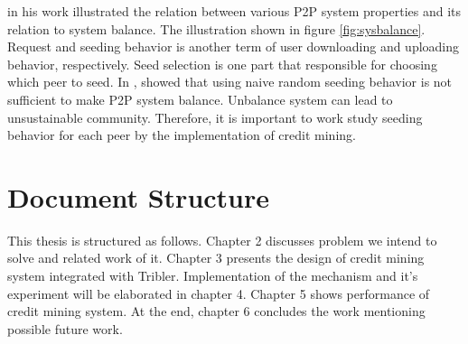 \citeauthor{2011:managesupplydemand:meulpolder} in his work illustrated the relation between various P2P system properties and its relation to system balance. The illustration shown in figure \ref{fig:sysbalance}. Request and seeding behavior is another term of user downloading and uploading behavior, respectively. Seed selection is one part that responsible for choosing which peer to seed. In \cite{2011:managesupplydemand:meulpolder}, \citeauthor{2011:managesupplydemand:meulpolder} showed that using naive random seeding behavior is not sufficient to make P2P system balance. Unbalance system can lead to unsustainable community. Therefore, it is important to work study seeding behavior for each peer by the implementation of credit mining.

\section{Document Structure}
This thesis is structured as follows. Chapter 2 discusses problem we intend to solve and related work of it. Chapter 3 presents the design of credit mining system integrated with Tribler. Implementation of the mechanism and it's experiment will be elaborated in chapter 4. Chapter 5 shows performance of credit mining system. At the end, chapter 6 concludes the work mentioning possible future work.


